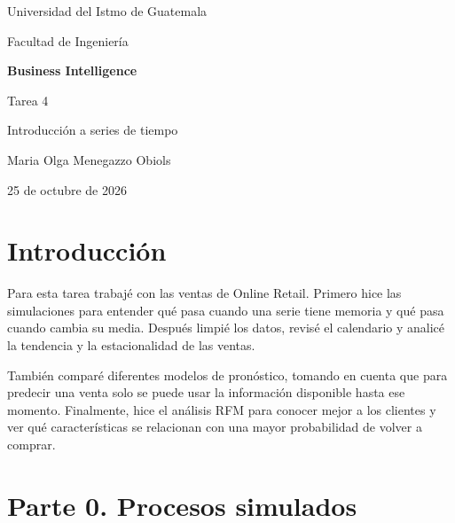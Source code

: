 \documentclass[11pt,letterpaper]{article}
\begin{document}
\begin{titlepage}
    \centering
    \vspace*{2cm}

    {\Large Universidad del Istmo de Guatemala\par}
    \vspace{0.5cm}

    {\large Facultad de Ingeniería\par}
    \vspace{2cm}

    {\LARGE\bfseries Business Intelligence\par}
    \vspace{0.7cm}

    {\Large Tarea 4\par}
    \vspace{0.4cm}

    {\Large Introducción a series de tiempo\par}

    \vfill

    {\large Maria Olga Menegazzo Obiols\par}
    \vspace{1cm}

    {\large 25 de octubre de 2026\par}

    \vspace*{1cm}
\end{titlepage}

\section*{Introducción}

Para esta tarea trabajé con las ventas de Online Retail. Primero hice las simulaciones para entender qué pasa cuando una serie tiene memoria y qué pasa cuando cambia su media. Después limpié los datos, revisé el calendario y analicé la tendencia y la estacionalidad de las ventas.

También comparé diferentes modelos de pronóstico, tomando en cuenta que para predecir una venta solo se puede usar la información disponible hasta ese momento. Finalmente, hice el análisis RFM para conocer mejor a los clientes y ver qué características se relacionan con una mayor probabilidad de volver a comprar.

\section*{Parte 0. Procesos simulados}
\end{document}
